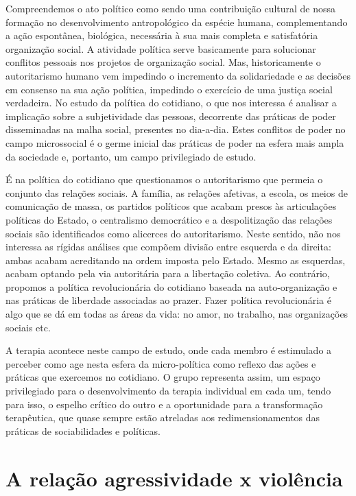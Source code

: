 Compreendemos o ato político como sendo uma contribuição cultural de
nossa formação no desenvolvimento antropológico da espécie humana,
complementando a ação espontânea, biológica, necessária à sua mais
completa e satisfatória organização social. A atividade política serve
basicamente para solucionar conflitos pessoais nos projetos de
organização social. Mas, historicamente o autoritarismo humano vem
impedindo o incremento da solidariedade e as decisões em consenso na sua
ação política, impedindo o exercício de uma justiça social verdadeira.
No estudo da política do cotidiano, o que nos interessa é analisar a
implicação sobre a subjetividade das pessoas, decorrente das práticas de
poder disseminadas na malha social, presentes no dia-a-dia. Estes
conflitos de poder no campo microssocial é o germe inicial das práticas
de poder na esfera mais ampla da sociedade e, portanto, um campo
privilegiado de estudo.

É na política do cotidiano que questionamos o autoritarismo que permeia
o conjunto das relações sociais. A família, as relações afetivas, a
escola, os meios de comunicação de massa, os partidos políticos que
acabam presos às articulações políticas do Estado, o centralismo
democrático e a despolitização das relações sociais são identificados
como alicerces do autoritarismo. Neste sentido, não nos interessa as
rígidas análises que compõem divisão entre esquerda e da direita: ambas
acabam acreditando na ordem imposta pelo Estado. Mesmo as esquerdas,
acabam optando pela via autoritária para a libertação coletiva. Ao
contrário, propomos a política revolucionária do cotidiano baseada na
auto-organização e nas práticas de liberdade associadas ao prazer. Fazer
política revolucionária é algo que se dá em todas as áreas da vida: no
amor, no trabalho, nas organizações sociais etc.

A terapia acontece neste campo de estudo, onde cada membro é estimulado
a perceber como age nesta esfera da micro-política como reflexo das
ações e práticas que exercemos no cotidiano. O grupo representa assim,
um espaço privilegiado para o desenvolvimento da terapia individual em
cada um, tendo para isso, o espelho crítico do outro e a oportunidade
para a transformação terapêutica, que quase sempre estão atreladas aos
redimensionamentos das práticas de sociabilidades e políticas.

\section{A relação agressividade x violência}


